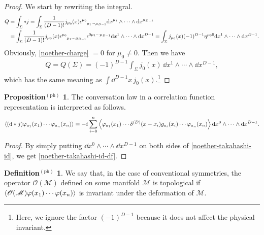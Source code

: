 \documentclass{article}
\theoremstyle{definition}
\newtheorem{definitionph}{Definition$^\mathrm{(ph)}$}[section]
\newtheorem{propositionph}{Proposition$^\mathrm{(ph)}$}[section]
\numberwithin{equation}{section}
\begin{document}
\begin{proof}
  We start by rewriting the integral.
  \begin{align}
    Q &= \int_{\Sigma} *j = \int_{\Sigma} \frac{1}{(D - 1)!}j_{\mu_0}(x) \tensor{\epsilon}{^{\mu_0}_{\mu_1\cdots\mu_{D-1}}} \dd x^{\mu_1} \wedge \cdots \wedge \dd x^{\mu_{D-1}}
    \notag \\
      &= \int_{\Sigma} \frac{1}{(D - 1)!}j_{\mu_0}(x) \tensor{\epsilon}{^{\mu_0}_{\mu_1\cdots\mu_{D-1}}}\tensor{\epsilon}{^{0\mu_1\cdots\mu_{D-1}}}
        \dd x^{1} \wedge \cdots \wedge \dd x^{D-1} = \int_{\Sigma} j_{\mu_0}(x) (-1)^{D-1}\eta^{\mu_0 0} \dd x^{1} \wedge \cdots \wedge \dd x^{D-1}. \label{noether-charge}
  \end{align}
  Obviously, \eqref{noether-charge} $= 0$ for $\mu_0 \ne 0$. Then we have
  \begin{align}
    Q = Q(\Sigma) = (-1)^{D-1}  \int_{\Sigma} j_{0}(x) \, \dd x^{1} \wedge \cdots \wedge \dd x^{D-1},
  \end{align}
  which has the same meaning as ${\displaystyle \int \dd^{D-1}x}\, j_0(x)$.\footnote{Here, we ignore the factor $(-1)^{D-1}$ because it does not affect the physical invariant.}
\end{proof}

\begin{propositionph}
  The conversation law in a correlation function representation is interpreted as follows.
  \begin{align}
    \ev{(\dd * j) \varphi_{a_1}(x_1) \cdots \varphi_{a_n}(x_n)}
    = -i \sum_{i = 0}^{n} \ev{\varphi_{a_1}(x_1) \cdots \delta^{(D)}(x - x_i)g_{a_i}(x_i) \cdots \varphi_{a_n}(x_n)} \dd x^0 \wedge \cdots \wedge \dd x^{D-1}.
    \label{noether-takahashi-id-df}
  \end{align}
\end{propositionph}

\begin{proof}
  By simply putting $\dd x^0 \wedge \cdots \wedge \dd x^{D-1}$ on both sides of \eqref{noether-takahashi-id}, we get \eqref{noether-takahashi-id-df}.
\end{proof}

\begin{definitionph}
  We say that, in the case of conventional symmetries, the operator $\mathscr{O}(\mathscr{M})$ defined on some manifold $\mathscr{M}$ is topological if $\ev{\mathscr{O}(\mathscr{M}) \varphi(x_1) \cdots \varphi(x_n)}$ is invariant under the deformation of $\mathscr{M}$.
\end{definitionph}
\end{document}

